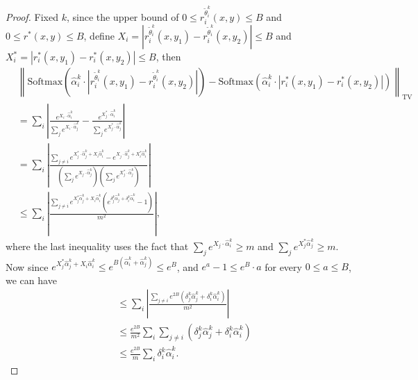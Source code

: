 \begin{proof}
    Fixed $k$, since the upper bound of $0\le r_i^{\tilde{\theta}_i^{k}}(x,y) \le B$ and $0\le r^*(x,y) \le B$, define $X_i = |r_i^{\tilde{\theta}_i^k}(x,y_1)-r_i^{\tilde{\theta}_i^k}(x,y_2)|\le B$ and $X_i^* = |r^*_i(x,y_1) - r^*_i(x,y_2)|\le B$, then 
    \begin{align*}
        &\left\|\textrm{Softmax}(\hat{\alpha}_i^k \cdot |r_i^{\tilde{\theta}_i^k}(x,y_1)-r_i^{\tilde{\theta}_i^k}(x,y_2)|)-\textrm{Softmax}(\hat{\alpha}_i^{k}\cdot |r_i^*(x,y_1)-r_i^*(x,y_2)|)\right\|_{\mathrm{TV}}\\
        &= \sum_i \left|\frac{e^{X_i\cdot \hat{\alpha}_i^k}}{\sum_j e^{X_i\cdot \hat{\alpha}_j^k}}-\frac{e^{X_j^*\cdot \hat{\alpha}_i^k}}{\sum_j e^{X_j^*\cdot \hat{\alpha}_j^k}}\right|\\
        &=\sum_i \left|\frac{\sum_{j\neq i}e^{X_j^*\cdot \hat{\alpha}_j^k+X_i\hat{\alpha}_i^k }-e^{X_j\cdot \hat{\alpha}_j^k+X_i^*\hat{\alpha}_i^k }}{(\sum_j e^{X_j\cdot \hat{\alpha}_j^k})(\sum_j e^{X_j^*\cdot \hat{\alpha}_j^k})}\right|\\
        &\le \sum_i \left|\frac{\sum_{j\neq i}e^{X_j^* \hat{\alpha}_j^k+X_i\hat{\alpha}_i^k}(e^{\delta_j^{k} \hat{\alpha}_j^k + \delta_i^{k} \hat{\alpha}_i^k}-1)}{m^2}\right|,\end{align*}
where the last inequality uses the fact that $\sum_{j}e^{X_j\cdot \hat{\alpha}_i^k} \ge m$ and $\sum_j e^{X_j^* \hat{\alpha}_j^k} \ge m$.
Now since $e^{X_j^* \hat{\alpha}_j^k + X_i \hat{\alpha}_i^k}\le e^{B(\hat{\alpha}_i^k + \hat{\alpha}_j^k)}\le e^B$, and $e^a-1\le e^B\cdot a$ for every $0\le a \le B$, we can have 
        \begin{align*}
        &\le \sum_i \left|\frac{\sum_{j\neq i}e^{2B}(\delta_j^{k} \hat{\alpha}_j^k + \delta_i^{k} \hat{\alpha}_i^k)}{m^2}\right|\\
        &\le \frac{e^{2B}}{m^2}\sum_i \sum_{j\neq i}(\delta_j^{k} \hat{\alpha}_j^k + \delta_i^{k} \hat{\alpha}_i^k)\\
        &\le \frac{e^{2B}}{m}\sum_i \delta_i^{k} \hat{\alpha}_i^k.
    \end{align*}


\end{proof}
